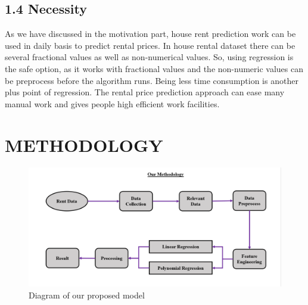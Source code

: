 \documentclass[conference]{IEEEtran}[10]
\begin{document}
\subsection*{1.4 Necessity}
As we have discussed in the motivation part, house rent prediction work can be used in daily basis to predict rental prices. In house rental dataset there can be several fractional values as well as non-numerical values. So, using regression is the safe option, as it works with fractional values and the non-numeric values can be preprocess before the algorithm runs. Being less time consumption is another plus point of regression. The rental price prediction approach can ease many  manual work and gives people high efficient work facilities. 

\section{METHODOLOGY}
\begin{figure}[H]
\centering
\includegraphics[scale=0.2]{methodology}
\caption{ Diagram of our proposed model}
\end{figure}
\end{document}

